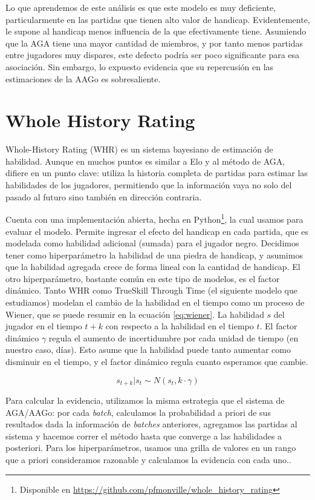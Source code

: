 \documentclass[a4paper,10pt]{report}
\begin{document}
Lo que aprendemos de este análisis es que este modelo es muy deficiente, particularmente en las partidas que tienen alto valor de handicap.
Evidentemente, le supone al handicap menos influencia de la que efectivamente tiene.
Asumiendo que la AGA tiene una mayor cantidad de miembros, y por tanto menos partidas entre jugadores muy dispares, este defecto podría ser poco significante para esa asociación.
Sin embargo, lo expuesto evidencia %
que su repercusión en las estimaciones de la AAGo es sobresaliente.




\section*{Whole History Rating}

Whole-History Rating (WHR)  es un sistema bayesiano de estimación de habilidad.
Aunque en muchos puntos es similar a Elo y al método de AGA, difiere en un punto clave: utiliza la historia completa de partidas para estimar las habilidades de los jugadores, permitiendo que la información vaya no solo del pasado al futuro sino también en dirección contraria.

Cuenta con una implementación abierta, hecha en Python\footnote{Disponible en \url{https://github.com/pfmonville/whole_history_rating}}, la cual usamos para evaluar el modelo.
Permite ingresar el efecto del handicap en cada partida, que es modelada como habilidad adicional (sumada) para el jugador negro.
Decidimos tener como hiperparámetro la habilidad de una piedra de handicap, y asumimos que la habilidad agregada crece de forma lineal con la cantidad de handicap.
El otro hiperparámetro, bastante común en este tipo de modelos, es el factor dinámico.
Tanto WHR como TrueSkill Through Time (el siguiente modelo que estudiamos) modelan el cambio de la habilidad en el tiempo como un proceso de Wiener, que se puede resumir en la ecuación \ref{eq:wiener}.
La habilidad $s$ del jugador en el tiempo $t+k$ con respecto a la habilidad en el tiempo $t$.
El factor dinámico $\gamma$ regula el aumento de incertidumbre por cada unidad de tiempo (en nuestro caso, días).
Esto asume que la habilidad puede tanto aumentar como disminuir en el tiempo, y el factor dinámico regula cuanto esperamos que cambie.

\begin{equation}\label{eq:wiener}
	s_{t+k} | s_t \sim N(s_t, k \cdot \gamma)
\end{equation}

Para calcular la evidencia, utilizamos la misma estrategia que el sistema de AGA/AAGo: por cada \textit{batch}, calculamos la probabilidad a priori de sus resultados dada la información de \textit{batches} anteriores, agregamos las partidas al sistema y hacemos correr el método hasta que converge a las habilidades a posteriori.
Para los hiperparámetros, usamos una grilla de valores en un rango que a priori consideramos razonable y calculamos la evidencia con cada uno..
\end{document}
